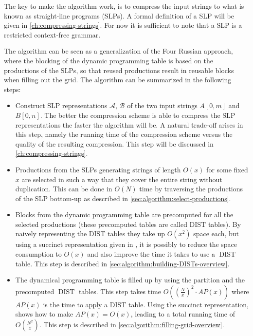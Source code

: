 \documentclass[twoside,11pt,openright]{report}
\newcommand{\DIST}{\operatorname{DIST}}
\newcommand{\str}[3]{#1[#2, #3]}
\newcommand{\SLP}[1] {\mathcal{#1}}
\begin{document}
The key to make the algorithm work, is to compress the input strings to what is known as straight-line programs (SLPs). A formal definition of a SLP will be given in \cref{ch:compressing-strings}. For now it is sufficient to note that a SLP is a restricted context-free grammar.

The algorithm can be seen as a generalization of the Four Russian approach, where the blocking of the dynamic programming table is based on the productions of the SLPs, so that reused productions result in reusable blocks when filling out the grid. The algorithm can be summarized in the following steps:
\begin{itemize}
  \item Construct SLP representations $\SLP{A}$, $\SLP{B}$ of the two input strings $\str{A}{0}{m}$ and $\str{B}{0}{n}$. The better the compression scheme is able to compress the SLP representations the faster the algorithm will be. A natural trade-off arises in this step, namely the running time of the compression scheme versus the quality of the resulting compression. This step will be discussed in \cref{ch:compressing-strings}.
  \item Productions from the SLPs generating strings of length $O(x)$ for some fixed $x$ are selected in such a way that they cover the entire string without duplication. This can be done in $O(N)$ time by traversing the productions of the SLP bottom-up as described in \cref{sec:algorithm:select-productions}.
  \item Blocks from the dynamic programming table are precomputed for all the selected productions (these precomputed tables are called DIST tables). By naively representing the DIST tables they take up $O(x^2)$ space each, but using a succinct representation given in \cite{DBLP:journals/corr/abs-0707-3619}, it is possibly to reduce the space consumption to $O(x)$ and also improve the time it takes to use a $\DIST$ table. This step is described in \cref{sec:algorithm:building-DISTs-overview}.
  \item The dynamical programming table is filled up by using the partition and the precomputed $\DIST$ tables. This step takes time $O\left(\left(\frac{N}{x}\right)^2 \cdot AP(x)\right)$ where $AP(x)$ is the time to apply a DIST table. Using the succinct representation, \cite{Gawrychowski:2012:FAC:2422024.2422048} shows how to make $AP(x) = O(x)$, leading to a total running time of $O(\frac{N^2}{x})$. This step is described in \cref{sec:algorithm:filling-grid-overview}.
\end{itemize}
\end{document}
